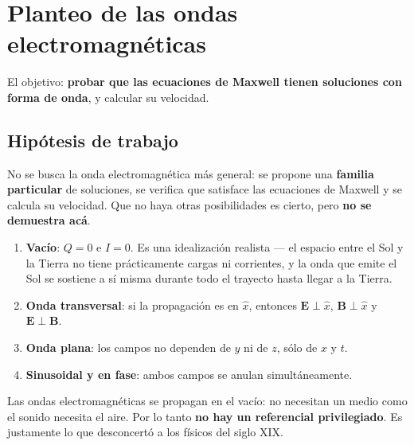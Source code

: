 \documentclass[12pt,a4paper]{article}
\begin{document}
\section{Planteo de las ondas electromagnéticas}

El objetivo: \textbf{probar que las ecuaciones de Maxwell tienen soluciones
con forma de onda}, y calcular su velocidad.

\subsection{Hipótesis de trabajo}

\begin{warnbox}
No se busca la onda electromagnética más general: se propone una
\textbf{familia particular} de soluciones, se verifica que satisface las
ecuaciones de Maxwell y se calcula su velocidad. Que no haya otras
posibilidades es cierto, pero \textbf{no se demuestra acá}.
\end{warnbox}

\begin{enumerate}
  \item \textbf{Vacío}: $Q = 0$ e $I = 0$. Es una idealización realista ---
        el espacio entre el Sol y la Tierra no tiene prácticamente cargas ni
        corrientes, y la onda que emite el Sol se sostiene a sí misma durante
        todo el trayecto hasta llegar a la Tierra.
  \item \textbf{Onda transversal}: si la propagación es en $\hat{x}$,
        entonces $\mathbf{E} \perp \hat{x}$, $\mathbf{B} \perp \hat{x}$ y
        $\mathbf{E} \perp \mathbf{B}$.
  \item \textbf{Onda plana}: los campos no dependen de $y$ ni de $z$, sólo de
        $x$ y $t$.
  \item \textbf{Sinusoidal y en fase}: ambos campos se anulan
        simultáneamente.
\end{enumerate}

\begin{notebox}
Las ondas electromagnéticas se propagan en el vacío: no necesitan un medio
como el sonido necesita el aire. Por lo tanto \textbf{no hay un referencial
privilegiado}. Es justamente lo que desconcertó a los físicos del siglo XIX.
\end{notebox}
\end{document}
